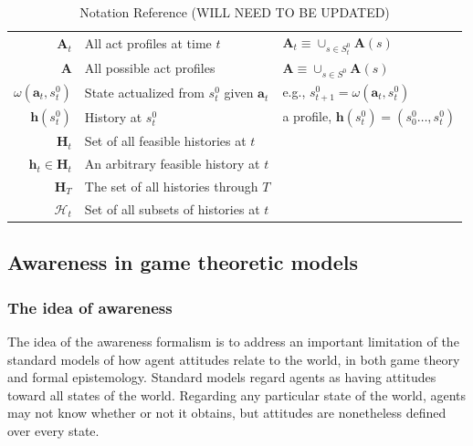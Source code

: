 \documentclass[
11pt,
titlepage,
reqno,
]{article}%
\theoremstyle{definition}
\begin{document}
\begin{table}
\begin{tabular}{@{}rll@{}}
$\mathbf{A}_t$                                     & All act profiles at time $t$                          & $\mathbf{A}_t\equiv \cup_{s\in S^0_t} \mathbf{A}(s)$\\
$\mathbf{A}$                                       & All possible act profiles                             & $\mathbf{A}\equiv \cup_{s\in S^0} \mathbf{A}(s)$\\
$\omega(\mathbf{a}_t,s^0_t)$                       & State actualized from $s^0_t$ given $\mathbf{a}_t$    & e.g., $s^0_{t+1}=\omega(\mathbf{a}_t,s^0_t)$\\
$\mathbf{h}(s^0_t)$                                & History at $s^0_t$                                    & a profile, $\mathbf{h}(s^0_t)=(s^0_0\ldots,s^0_t)$\\
$\mathbf{H}_t$                                     & Set of all feasible histories at $t$                  & \\
$\mathbf{h}_t\in \mathbf{H}_t$                     & An arbitrary feasible history at $t$                  & \\
$\mathbf{H}_T$                                     & The set of all histories through $T$                  & 	\\
$\mathcal{H}_t$                                    & Set of all subsets of histories at $t$                & \\
\bottomrule
\end{tabular}
\caption{Notation Reference (WILL NEED TO BE UPDATED)}\label{Tab: Notation}
\end{table}
\pagebreak


\subsection{Awareness in game theoretic models}
\subsubsection{The idea of awareness}

The idea of the awareness formalism is to address an important limitation of the standard models of how agent attitudes relate to the world, in both game theory and formal epistemology. Standard models regard agents as having attitudes toward all states of the world. Regarding any particular state of the world, agents may not know whether or not it obtains, but attitudes are nonetheless defined over every state.
\end{document}
